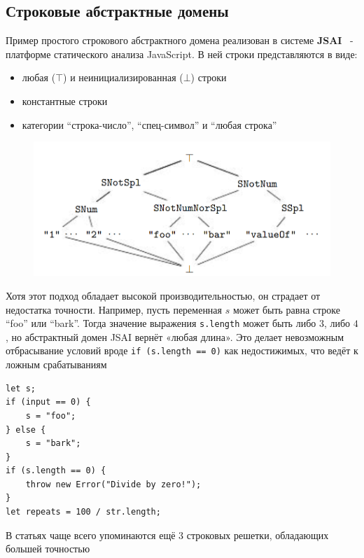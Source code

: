 \subsection{Строковые абстрактные домены}

Пример простого строкового абстрактного домена реализован в системе \textbf{JSAI}~\cite{guha2012jsai} - платформе статического анализа JavaScript. В ней строки представляются в виде:
\begin{itemize}
    \item любая ($\top$) и неинициализированная ($\bot$) строки
    \item константные строки
    \item категории ``строка-число'', ``спец-символ'' и ``любая строка''
\end{itemize}

\begin{figure}[H]
\includegraphics[width=\textwidth]{images/jsai-string-lattice.png}\hfill
\end{figure}


Хотя этот подход обладает высокой производительностью, он страдает от недостатка точности. Например, пусть переменная $s$ может быть равна строке ``foo'' или ``bark''. Тогда значение выражения \texttt{s.length} может быть либо $3$, либо $4$, но абстрактный домен JSAI вернёт «любая длина». Это делает невозможным отбрасывание условий вроде \texttt{if (s.length == 0)} как недостижимых, что ведёт к ложным срабатываниям

\newpage
\begin{lstlisting}[caption={Пример недостаточной точности в строковом домене JSAI}]
let s;
if (input == 0) {
    s = "foo";
} else {
    s = "bark";
}
if (s.length == 0) {
    throw new Error("Divide by zero!");
}
let repeats = 100 / str.length;
\end{lstlisting}

В статьях чаще всего упоминаются ещё 3 строковых решетки, обладающих большей точностью


